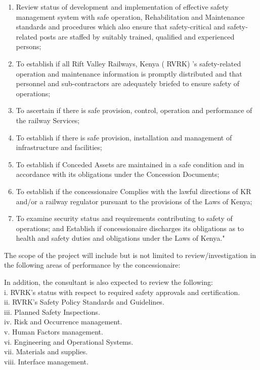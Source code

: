  \begin{enumerate}
 	\item   Review status of development and implementation of effective safety management system with safe operation, Rehabilitation and Maintenance standards and procedures which also ensure that safety-critical and safety-related posts are staffed by suitably trained, qualified and experienced persons;
 	\item  To establish if all Rift Valley Railways, Kenya ( RVRK) ’s safety-related operation and maintenance information is promptly distributed and that personnel and sub-contractors are adequately briefed to ensure safety of operations;
 	\item  To ascertain if there is safe provision, control, operation and performance of the railway Services;
 	\item  To establish if there is safe provision, installation and management of infrastructure and facilities;
 	\item  To establish if Conceded Assets are maintained in a safe condition and in accordance with its obligations under the Concession Documents;
 	\item  To establish if the concessionaire Complies with the lawful directions of KR and/or a railway regulator pursuant to the provisions of the Laws of Kenya;
 	\item  To examine security status and requirements contributing to safety of operations; and Establish if concessionaire discharges its obligations as to health and safety duties and obligations under the Laws of Kenya." 
 \end{enumerate}
 The scope of the project will include but is not limited to review/investigation in the
 following areas of performance by the concessionaire:
 
 
 
 In addition, the consultant is also expected to review the
 following:\\i. RVRK's status with respect to required safety approvals
 and certification.\\ii. RVRK's Safety Policy Standards and
 Guidelines.\\iii. Planned Safety Inspections.\\iv. Risk and Occurrence
 management.\\v. Human Factors management.\\vi. Engineering and
 Operational Systems.\\vii. Materials and supplies.\\viii. Interface
 management.
 
